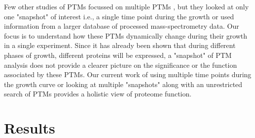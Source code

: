 \documentclass[12pt]{article}
\begin{document}

Few other studies of PTMs focussed on multiple PTMs \cite{Guptaetal2007}, but they looked at only one "snapshot" of interest i.e., a single time point during the growth or used information from a larger database of processed mass-spectrometry data. Our focus is to understand how these PTMs dynamically change during their growth in a single experiment. Since it has already been shown that during different phases of growth, different proteins will be expressed, a "snapshot" of PTM analysis does not provide a clearer picture on the significance or the function associated by these PTMs. Our current work of using multiple time points during the growth curve or looking at multiple "snapshots" along with an unrestricted search of PTMs provides a holistic view of proteome function. 



\section{Results}
\end{document}
